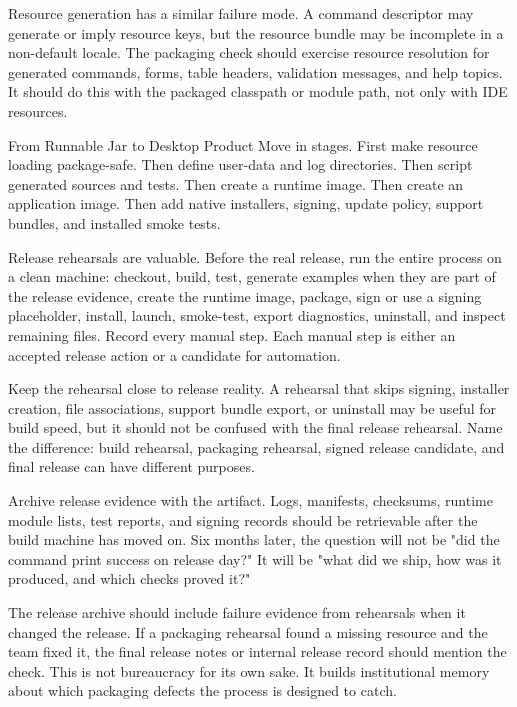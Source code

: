 Resource generation has a similar failure mode. A command descriptor may generate or imply resource keys, but the resource bundle may be incomplete in a non-default locale. The packaging check should exercise resource resolution for generated commands, forms, table headers, validation messages, and help topics. It should do this with the packaged classpath or module path, not only with IDE resources.

\begin{migrationbox}{From Runnable Jar to Desktop Product}
Move in stages. First make resource loading package-safe. Then define user-data and log directories. Then script generated sources and tests. Then create a runtime image. Then create an application image. Then add native installers, signing, update policy, support bundles, and installed smoke tests.
\end{migrationbox}

Release rehearsals are valuable. Before the real release, run the entire process on a clean machine: checkout, build, test, generate examples when they are part of the release evidence, create the runtime image, package, sign or use a signing placeholder, install, launch, smoke-test, export diagnostics, uninstall, and inspect remaining files. Record every manual step. Each manual step is either an accepted release action or a candidate for automation.

Keep the rehearsal close to release reality. A rehearsal that skips signing, installer creation, file associations, support bundle export, or uninstall may be useful for build speed, but it should not be confused with the final release rehearsal. Name the difference: build rehearsal, packaging rehearsal, signed release candidate, and final release can have different purposes.

Archive release evidence with the artifact. Logs, manifests, checksums, runtime module lists, test reports, and signing records should be retrievable after the build machine has moved on. Six months later, the question will not be "did the command print success on release day?" It will be "what did we ship, how was it produced, and which checks proved it?"

The release archive should include failure evidence from rehearsals when it changed the release. If a packaging rehearsal found a missing resource and the team fixed it, the final release notes or internal release record should mention the check. This is not bureaucracy for its own sake. It builds institutional memory about which packaging defects the process is designed to catch.

